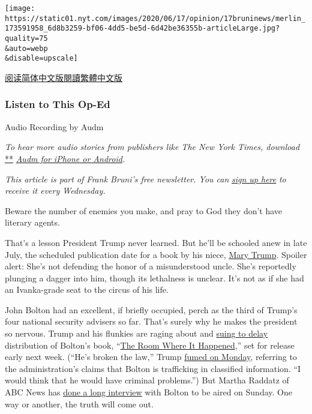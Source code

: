\texttt{[image: https://static01.nyt.com/images/2020/06/17/opinion/17bruninews/merlin\_173591958\_6d8b3259-bf06-4dd5-be5d-6d42be36355b-articleLarge.jpg?quality=75\\\&auto=webp\\\&disable=upscale]}

\href{https://cn.nytimes.com/opinion/20200622/trump-mary-book/}{阅读简体中文版}\href{https://cn.nytimes.com/opinion/20200622/trump-mary-book/zh-hant/}{閱讀繁體中文版}

\hypertarget{listen-to-this-op-ed}{%
\subsubsection{Listen to This Op-Ed}\label{listen-to-this-op-ed}}

Audio Recording by Audm

\emph{To hear more audio stories from publishers like The New York
Times, download}
\href{https://www.audm.com/?utm_source=nytmag\&utm_medium=embed\&utm_campaign=left_behind_draper}{**}
\href{https://www.audm.com/?utm_source=nytopinion\&utm_medium=embed\&utm_campaign=revenge_trump_tattletales}{\emph{Audm
for iPhone or Android}}\emph{.}

\emph{This article is part of Frank Bruni's free newsletter. You can}
\href{https://www.nytimes.com/newsletters/frank-bruni}{\emph{sign up
here}} \emph{to receive it every Wednesday.}

Beware the number of enemies you make, and pray to God they don't have
literary agents.

That's a lesson President Trump never learned. But he'll be schooled
anew in late July, the scheduled publication date for a book by his
niece,
\href{https://www.nytimes.com/2020/07/01/us/politics/mary-trump-book-lawsuit.html}{Mary
Trump}. Spoiler alert: She's not defending the honor of a misunderstood
uncle. She's reportedly plunging a dagger into him, though its
lethalness is unclear. It's not as if she had an Ivanka-grade seat to
the circus of his life.

John Bolton had an excellent, if briefly occupied, perch as the third of
Trump's four national security advisers so far. That's surely why he
makes the president so nervous. Trump and his flunkies are raging about
and
\href{https://www.nytimes.com/2020/06/16/us/politics/john-bolton-book-publication.html}{suing
to delay} distribution of Bolton's book,
``\href{https://www.nytimes.com/2020/06/17/books/review-room-where-it-happened-john-bolton-memoir.html}{The
Room Where It Happened},'' set for release early next week. (``He's
broken the law,'' Trump
\href{https://abcnews.go.com/Politics/note-trumps-threats-boost-boltons-book/story?id=71259356}{fumed
on Monday}, referring to the administration's claims that Bolton is
trafficking in classified information. ``I would think that he would
have criminal problems.'') But Martha Raddatz of ABC News has
\href{https://deadline.com/2020/06/john-bolton-abc-news-donald-trump-martha-raddatz-1202959216/}{done
a long interview} with Bolton to be aired on Sunday. One way or another,
the truth will come out.

